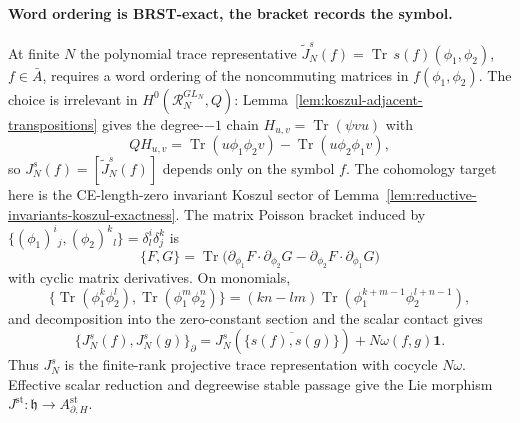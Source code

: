 \documentclass[11pt]{memoir}
\begin{document}
\paragraph{Word ordering is BRST-exact, the bracket records the symbol.}
At finite \(N\) the polynomial trace representative
\(\widetilde J_N^s(f)=\operatorname{Tr}\,s(f)(\phi_1,\phi_2)\),
\(f\in\bar A\), requires a word ordering of the noncommuting
matrices in \(f(\phi_1,\phi_2)\).  The choice is irrelevant in
\(H^0(\mathcal R_N^{GL_N},Q)\): Lemma~\ref{lem:koszul-adjacent-transpositions}
gives the degree-\(-1\) chain \(H_{u,v}=\operatorname{Tr}(\psi vu)\)
with
\[
  QH_{u,v}
  =
  \operatorname{Tr}(u\phi_1\phi_2v)
  -\operatorname{Tr}(u\phi_2\phi_1v),
\]
so \(J_N^s(f)=[\widetilde J_N^s(f)]\) depends only on the symbol \(f\).
The cohomology target here is the CE-length-zero invariant Koszul
sector of Lemma~\ref{lem:reductive-invariants-koszul-exactness}.
The matrix Poisson bracket induced by
\(\{(\phi_1)^i{}_j,(\phi_2)^k{}_l\}=\delta^i_l\delta^k_j\) is
\[
  \{F,G\}=\operatorname{Tr}\bigl(
    \partial_{\phi_1}F\cdot\partial_{\phi_2}G
    -\partial_{\phi_2}F\cdot\partial_{\phi_1}G\bigr)
\]
with cyclic matrix derivatives.  On monomials,
\begin{equation}\label{eq:bracket-coefficient}
\bigl\{\operatorname{Tr}(\phi_1^k\phi_2^l),
       \operatorname{Tr}(\phi_1^m\phi_2^n)\bigr\}
  =(kn-lm)\operatorname{Tr}
    (\phi_1^{k+m-1}\phi_2^{l+n-1}),
\end{equation}
and decomposition into the zero-constant section and the scalar contact
gives
\[
\{J_N^s(f),J_N^s(g)\}_\partial
=J_N^s\!\left(\overline{\{s(f),s(g)\}}\right)
 +N\omega(f,g)\mathbf1.
\]
Thus \(J_N^s\) is the finite-rank projective trace representation with
cocycle \(N\omega\).  Effective scalar reduction and degreewise stable
passage give the Lie morphism
\(J^{\mathrm{st}}\colon\mathfrak h\to A_{\partial,H}^{\mathrm{st}}\).
\end{document}
